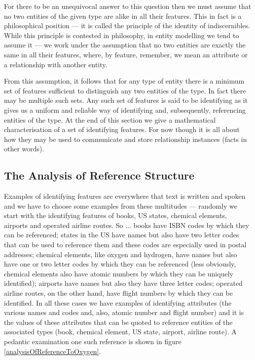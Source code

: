 For there to be an unequivocal answer to this question then we must assume that no two entities of the given type are alike in all their features. This in fact  is a philosophical position 
--- it is called the principle of the identity of indiscernibles. 
While this principle is contested in philosophy, in entity modelling we tend to assume it --- we work under the assumption that no two entities are exactly the same in all their features, where, by feature, remember, we mean an attribute or a relationship with another entity. 

From this assumption, it follows that for any type of entity there is a minimum set of features sufficient to distinguish any two entities of the type. In fact there may be multiple such sets. 
Any such set of features is said to be identifying as it gives us 
a uniform and reliable way of identifying and, subsequently, referencing entities of the type. At the end of this section we give a mathematical characterisation of a set of identifying features. For now though it is all about how they may be used to communicate and store relationship instances (facts in  other words).
\subsection{The Analysis of Reference Structure}
\mynote
Examples of identifying features are everywhere that text is written and spoken and we have to choose some examples from these multitudes
--- randomly we start with the identifying features of books, US states, chemical elements, airports and operated airline routes. 
So ... books have ISBN codes by which they can be referenced; 
states in the US have names but also have two letter codes that can be used to reference them and these codes are especially used in postal addresses; chemical elements, like oxygen and hydrogen, have names but also have one or two letter codes by which they can be referenced
(less obviously, chemical elements also have atomic numbers by which they can be uniquely identified); airports have names but also they have three letter codes; operated airline routes, on the other hand, 
have flight numbers by which they can be identified.
In all these cases we have examples of identifying attributes (the various names and codes and, also, atomic number and flight number) 
and it is the values of these attributes that can be quoted to reference entities of the associated types
(book, chemical element, US state, airport, airline route). A pedantic examination one such reference is shown in figure \ref{analysisOfReferenceToOxygen}.


